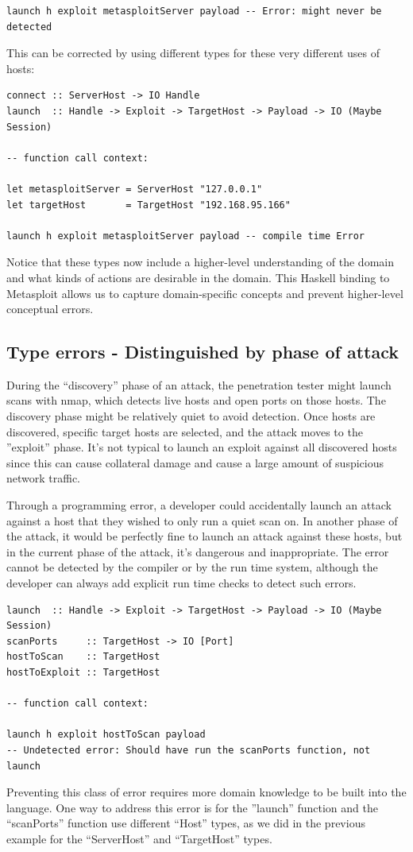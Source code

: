 \documentclass[figure,letterpaper,onefignum]{mysiam}
\begin{document}
\begin{verbatim}
launch h exploit metasploitServer payload -- Error: might never be detected
\end{verbatim}
This can be corrected by using different types for these very different uses of hosts:

\begin{verbatim}
connect :: ServerHost -> IO Handle
launch  :: Handle -> Exploit -> TargetHost -> Payload -> IO (Maybe Session)

-- function call context:

let metasploitServer = ServerHost "127.0.0.1"
let targetHost       = TargetHost "192.168.95.166"

launch h exploit metasploitServer payload -- compile time Error
\end{verbatim}
Notice that these types now include a higher-level understanding of the domain and what kinds of actions are desirable in the domain. This Haskell binding to Metasploit allows us to capture domain-specific concepts and prevent higher-level conceptual errors.

\subsection{Type errors - Distinguished by phase of attack}
During the ``discovery'' phase of an attack, the penetration tester might launch scans with nmap, which detects live hosts and open ports on those hosts. The discovery phase might be relatively quiet to avoid detection. Once hosts are discovered, specific target hosts are selected, and the attack moves to the ''exploit'' phase. It's not typical to launch an exploit against all discovered hosts since this can cause collateral damage and cause a large amount of suspicious network traffic.

Through a programming error, a developer could accidentally launch an attack against a host that they wished to only run a quiet scan on. In another phase of the attack, it would be perfectly fine to launch an attack against these hosts, but in the current phase of the attack, it's dangerous and inappropriate. The error cannot be detected by the compiler or by the run time system, although the developer can always add explicit run time checks to detect such errors.

\begin{verbatim}
launch  :: Handle -> Exploit -> TargetHost -> Payload -> IO (Maybe Session)
scanPorts     :: TargetHost -> IO [Port]
hostToScan    :: TargetHost
hostToExploit :: TargetHost

-- function call context:

launch h exploit hostToScan payload
-- Undetected error: Should have run the scanPorts function, not launch
\end{verbatim}
Preventing this class of error requires more domain knowledge to be built into the language. One way to address this error is for the ''launch'' function and the ``scanPorts'' function use different ``Host'' types, as we did in the previous example for the ``ServerHost'' and ``TargetHost'' types.
\end{document}
